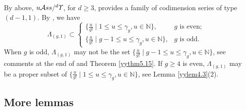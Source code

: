 \documentclass{amsart}
\newtheorem{lem}[thm]{Lemma}
\theoremstyle{definition}
\theoremstyle{remark}
\numberwithin{equation}{section}
\def\N{\mathbb{N}}
\newcommand{\up}[1]{{^{#1}{\it \!\Upsilon}}}
\def \uas{u\mathcal{A}ss}
\def \dim{\operatorname{dim}}
\def \N{\mathbb{N}}
\begin{document}
By above, $\uas/\up{d}$, for $d\geq 3$, provides a family of 
codimension series of type $(d-1,1)$. By 
\cite[Proposition 2.1]{GMP}, we have 
$$\Lambda_{(g,1)}\subset
\begin{cases}
\{ \frac{u}{g!} \mid 
1\leq u\leq \gamma_{g}, u\in \N\}, & {\text{$g$ is even}};\\
\{ \frac{u}{g!} \mid 
g-1\leq u\leq \gamma_{g}, u\in \N\}, & {\text{$g$ is odd}}.
\end{cases}
$$
When $g$ is odd, $\Lambda_{(g,1)}$ may not be the set 
$\{ \frac{u}{g!} \mid g-1\leq u\leq \gamma_{g}, u\in \N\}$, 
see comments at the end of \cite{GMP} and Theorem 
\ref{yythm5.15}. If $g\geq 4$ is even, $\Lambda_{(g,1)}$ may 
be a proper subset of $\{\frac{u}{g!} \mid 1\leq u\leq 
\gamma_{g}, u\in \N\}$, see Lemma \ref{yylem4.3}(2).


\subsection{More lemmas}
\label{yysec1.7}

%

\end{document}
